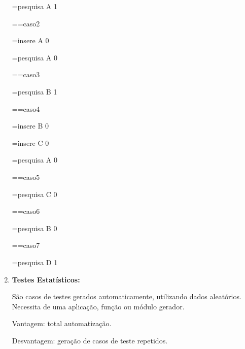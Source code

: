 \documentclass[
	12pt, %
]{fphw}
\begin{document}
\begin{doublespace}
\begin{enumerate}[label=\textbf{\arabic*)}]
              =pesquisa		A 1

              ==caso2

              =insere		A 0

              =pesquisa		A 0

              ==caso3

              =pesquisa		B 1

              ==caso4

              =insere		B 0

              =insere		C 0

              =pesquisa		A 0

              ==caso5

              =pesquisa		C 0

              ==caso6

              =pesquisa		B 0

              ==caso7

              =pesquisa		D 1

        \item \textbf{Testes Estatísticos:}
        
        São casos de testes gerados automaticamente, utilizando dados aleatórios. Necessita de uma aplicação, função ou módulo gerador.

        Vantagem: total automatização.

        Desvantagem: geração de casos de teste repetidos.


    \end{enumerate}


\end{doublespace}
\end{document}
